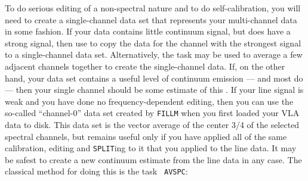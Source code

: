      To do serious editing of a non-spectral nature and to do
self-calibration, you will need to create a single-channel data set
that represents your multi-channel data in some fashion.  If your data
contains little continuum signal, but does have a strong
 signal, then use {\tt {}} to copy the
data for the channel with the strongest signal to a single-channel
data set. Alternatively, the task {\tt {}} may be used to
average a few adjacent channels together to create the single-channel
data.  If, on the other hand, your data set contains a useful level of
continuum emission --- and most do --- then your single channel should
be some estimate of this .  If your line signal is
weak and you have done no frequency-dependent editing, then you can
use the so-called ``channel-0'' data set created by {\tt FILLM} when
you first loaded your VLA data to disk.  This data set is the vector
average of the center 3/4 of the selected spectral channels, but
remains useful only if you have applied all of the same calibration,
editing and {\tt SPLIT}ing to it that you applied to the line data.
It may be safest to create a new continuum estimate from the line data
in any case.  The classical method for doing this is the task {\tt
AVSPC}:
\pd

